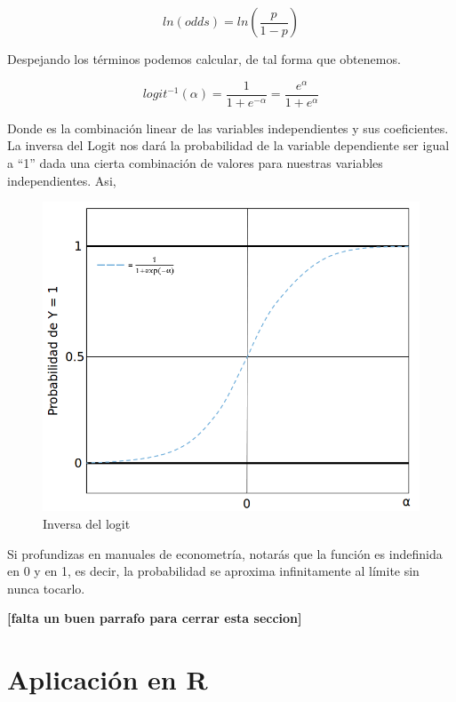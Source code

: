\documentclass[]{book}
\begin{document}
\[ ln(odds) = ln(\frac {p}{1 - p})
  \label{eq:bin-logodds} \]

Despejando los términos podemos calcular, de tal forma que obtenemos.

\[ logit^{-1}(\alpha) =  \frac {1}{1+e^{-\alpha}} = \frac {e^\alpha}{1+e^\alpha}
  \label{eq:bin-invdespejada} \]

Donde es la combinación linear de las variables independientes y sus
coeficientes. La inversa del Logit nos dará la probabilidad de la
variable dependiente ser igual a ``1'' dada una cierta combinación de
valores para nuestras variables independientes. Asi,

\begin{figure}

{\centering \includegraphics[width=10.43in]{00-images/bin-invlogit} 

}

\caption{Inversa del logit}\label{fig:bin-invlogit}
\end{figure}

Si profundizas en manuales de econometría, notarás que la función es
indefinida en 0 y en 1, es decir, la probabilidad se aproxima
infinitamente al límite sin nunca tocarlo.

\textbf{{[}falta un buen parrafo para cerrar esta seccion{]}}

\section{Aplicación en R}\label{aplicacion-en-r}
\end{document}
